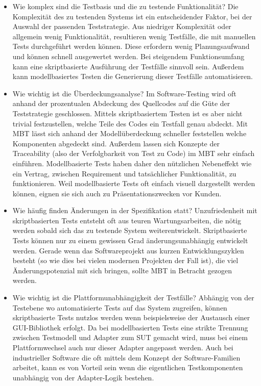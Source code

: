 \begin{itemize}
\item Wie komplex sind die Testbasis und die zu testende Funktionalität?
Die Komplexität des zu testenden Systems ist ein entscheidender Faktor, bei der Auswahl der passenden Teststrategie. Aus niedriger Komplexität oder allgemein wenig Funktionalität, resultieren wenig Testfälle, die mit manuellen Tests durchgeführt werden können. Diese erfordern wenig Planungsaufwand und können schnell ausgewertet werden. Bei steigendem Funktionsumfang kann eine skriptbasierte Ausführung der Testfälle sinnvoll sein. Außerdem kann modellbasiertes Testen die Generierung dieser Testfälle automatisieren.
\item Wie wichtig ist die Überdeckungsanalyse?
Im Software-Testing wird oft anhand der prozentualen Abdeckung des Quellcodes auf die Güte der Teststrategie geschlossen. Mittels skriptbasiertem Testen ist es aber nicht trivial festzustellen, welche Teile des Codes ein Testfall genau abdeckt. Mit MBT lässt sich anhand der Modellüberdeckung schneller feststellen welche Komponenten abgedeckt sind. Außerdem lassen sich Konzepte der Traceability (also der Verfolgbarkeit von Test zu Code) im MBT sehr einfach einführen. Modellbasierte Tests haben daher den nützlichen Nebeneffekt wie ein Vertrag, zwischen Requirement und tatsächlicher Funktionalität, zu funktionieren. Weil modellbasierte Tests oft einfach visuell dargestellt werden können, eignen sie sich auch zu Präsentationszwecken vor Kunden.
\item Wie häufig finden Änderungen in der Spezifikation statt? 
Unzufriedenheit mit skriptbasierten Tests entsteht oft aus teuren Wartungsarbeiten, die nötig werden sobald sich das zu testende System weiterentwickelt. Skriptbasierte Tests können nur zu einem gewissen Grad änderungsunabhängig entwickelt werden. Gerade wenn das Softwareprojekt aus kurzen Entwicklungszyklen besteht (so wie dies bei vielen modernen Projekten der Fall ist), die viel Änderungspotenzial mit sich bringen, sollte MBT in Betracht gezogen werden.
\item Wie wichtig ist die Plattformunabhängigkeit der Testfälle?
Abhängig von der Testebene wo automatisierte Tests auf das System zugreifen, können skriptbasierte Tests nutzlos werden wenn beispielsweise der Austausch einer GUI-Bibliothek erfolgt. Da bei modellbasierten Tests eine strikte Trennung zwischen Testmodell und Adapter zum SUT gemacht wird, muss bei einem Plattformwechsel auch nur dieser Adapter angepasst werden. Auch bei industrieller Software die oft mittels dem Konzept der Software-Familien arbeitet, kann es von Vorteil sein wenn die eigentlichen Testkomponenten unabhängig von der Adapter-Logik bestehen.

\end{itemize}
